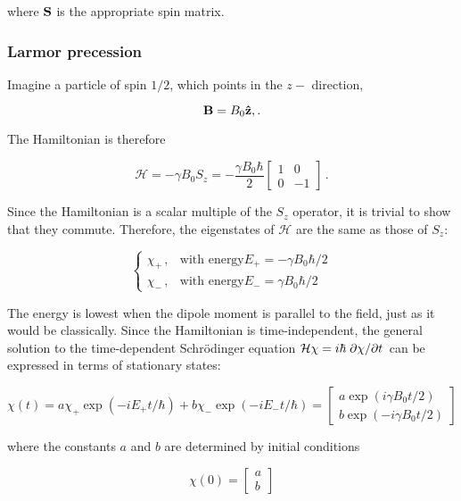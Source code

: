 \documentclass[12pt, titlepage]{article}
\begin{document}
where $\vb{S}$ is the appropriate spin matrix. 

\subsubsection{Larmor precession}
Imagine a particle of spin $1/2$, which points in the $z-$ direction,

\begin{equation*}
	\vb{B} = B_0\vu{z},.
\end{equation*}

The Hamiltonian is therefore

\begin{equation}
	\mathcal{H} = -\gamma B_0 S_z = -\frac{\gamma B_0 \hbar}{2} \begin{bmatrix} 1 & 0 \\ 0 & -1 \end{bmatrix} \,.
\end{equation}

Since the Hamiltonian is a scalar multiple of the $S_z$ operator, it is trivial to show that they commute. Therefore, the eigenstates of $\mathcal{H}$ are the same as those of $S_z$:

\begin{equation}
    \left\{
    \begin{array}{cc}
    \chi_+ \,, & \text{with energy} E_+ = -\gamma B_0\hbar/2 \\[6pt]
    \chi_- \,, & \text{with energy} E_- = \gamma B_0\hbar/2
    \end{array}
    \right.
\end{equation}

The energy is lowest when the dipole moment is parallel to the field, just as it would be classically. Since the Hamiltonian is time-independent, the general solution to the time-dependent Schrödinger equation $\mathcal{H}\chi = i\hbar\pdv*{\chi}{t}$ can be expressed in terms of stationary states:

\begin{equation*}
	\chi(t) = a\chi_+\exp(-i E_+ t/\hbar) + b\chi_-\exp(-i E_-t/\hbar) = \begin{bmatrix} a\exp(i\gamma B_0 t/2) \\[4pt] b\exp(-i\gamma B_0 t/2) \end{bmatrix}
\end{equation*}

where the constants $a$ and $b$ are determined by initial conditions

\begin{equation*}
\chi(0) = \begin{bmatrix} a \\ b \end{bmatrix}
\end{equation*}
\end{document}
